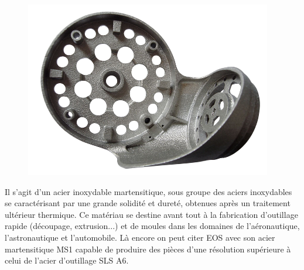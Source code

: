 \documentclass{article}
\begin{document}
\begin{figure}[h!]
\centering
\includegraphics[scale=0.4]{./images/acier-outillage.png}
\end{figure}\hfill
 \par\leavevmode\par
Il s'agit d'un acier inoxydable martensitique, sous groupe des aciers inoxydables se caractérisant par une grande solidité et dureté, obtenues après un traitement ultérieur thermique. Ce matériau se destine avant tout à la fabrication d'outillage rapide (découpage, extrusion...) et de moules dans les domaines de l'aéronautique, l'astronautique et l'automobile. Là encore on peut citer EOS avec son acier martensitique MS1 capable de produire des pièces d'une résolution supérieure à celui de l'acier d'outillage SLS A6.
\end{document}
